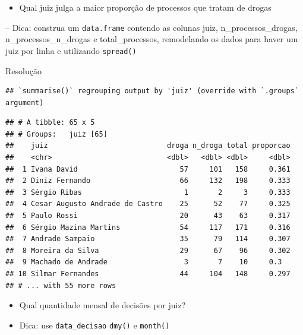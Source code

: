 \documentclass[
  10pt,
  ignorenonframetext,
]{beamer}
\providecommand{\tightlist}{%
  \setlength{\itemsep}{0pt}\setlength{\parskip}{0pt}}
\begin{document}
\begin{frame}[fragile]{}
\protect\hypertarget{section-1}{}
\begin{itemize}
\tightlist
\item
  Qual juiz julga a maior proporção de processos que tratam de drogas
\end{itemize}

-- Dica: construa um \texttt{data.frame} contendo as colunas juiz,
n\_processos\_drogas, n\_processos\_n\_drogas e total\_processos,
remodelando os dados para haver um juiz por linha e utilizando
\texttt{spread()}
\end{frame}

\begin{frame}[fragile]{Resolução}
\protect\hypertarget{resoluuxe7uxe3o}{}
\begin{verbatim}
## `summarise()` regrouping output by 'juiz' (override with `.groups` argument)
\end{verbatim}

\begin{verbatim}
## # A tibble: 65 x 5
## # Groups:   juiz [65]
##    juiz                            droga n_droga total proporcao
##    <chr>                           <dbl>   <dbl> <dbl>     <dbl>
##  1 Ivana David                        57     101   158     0.361
##  2 Diniz Fernando                     66     132   198     0.333
##  3 Sérgio Ribas                        1       2     3     0.333
##  4 Cesar Augusto Andrade de Castro    25      52    77     0.325
##  5 Paulo Rossi                        20      43    63     0.317
##  6 Sérgio Mazina Martins              54     117   171     0.316
##  7 Andrade Sampaio                    35      79   114     0.307
##  8 Moreira da Silva                   29      67    96     0.302
##  9 Machado de Andrade                  3       7    10     0.3  
## 10 Silmar Fernandes                   44     104   148     0.297
## # ... with 55 more rows
\end{verbatim}
\end{frame}

\begin{frame}[fragile]{}
\protect\hypertarget{section-2}{}
\begin{itemize}
\item
  Qual quantidade mensal de decisões por juiz?
\item
  Dica: use \texttt{data\_decisao} \texttt{dmy()} e \texttt{month()}
\end{itemize}
\end{frame}
\end{document}
